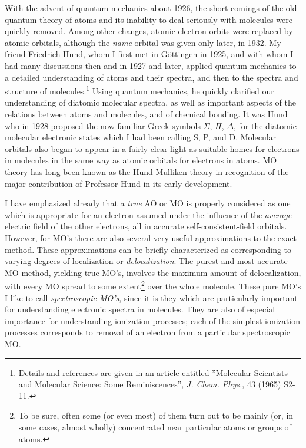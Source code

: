 \documentclass[11pt]{memoir}
\begin{document}
With the advent of quantum mechanics about 1926, the short-comings of the old quantum theory of atoms and its inability to deal seriously with molecules were quickly removed.  Among other changes, atomic electron orbits were replaced by atomic orbitals, although the \emph{name} orbital was given only later, in 1932.  My friend Friedrich Hund, whom I first met in G\"{o}ttingen in 1925, and with whom I had many discussions then and in 1927 and later, applied quantum mechanics to a detailed understanding of atoms and their spectra, and then to the spectra and structure of molecules.\footnote{Details and references are given in an article entitled ''Molecular Scientists and Molecular Science: Some Reminiscences'', \emph{J. Chem. Phys.}, 43 (1965) S2-11.}  Using quantum mechanics, he quickly clarified our understanding of diatomic molecular spectra, as well as important aspects of the relations between atoms and molecules, and of chemical bonding.  It was Hund who in 1928 proposed the now familiar Greek symbols $\Sigma$, $\Pi$, $\Delta$, for the diatomic molecular electronic states which I had been calling S, P, and D.  Molecular orbitals also began to appear in a fairly clear light as suitable homes for electrons in molecules in the same way as atomic orbitals for electrons in atoms.  MO theory has long been known as the Hund-Mulliken theory in recognition of the major contribution of Professor Hund in its early development.

I have emphasized already that a \emph{true} AO or MO is properly considered as one which is appropriate for an electron assumed under the influence of the \emph{average} electric field of the other electrons, all in accurate self-consistent-field orbitals.  However, for MO's there are also several very useful approximations to the exact method.  These approximations can be briefly characterized as corresponding to varying degrees of localization or \emph{delocalization}.  The purest and most accurate MO method, yielding true MO's, involves the maximum amount of delocalization, with every MO spread to some extent\footnote{To be sure, often some (or even most) of them turn out to be mainly (or, in some cases, almost wholly) concentrated near particular atoms or groups of atoms.} over the whole molecule.  These pure MO's I like to call \emph{spectroscopic MO's}, since it is they which are particularly important for understanding electronic spectra in molecules.  They are also of especial importance for understanding ionization processes; each of the simplest ionization processes corresponds to removal of an electron from a particular spectroscopic MO.  
\end{document}
